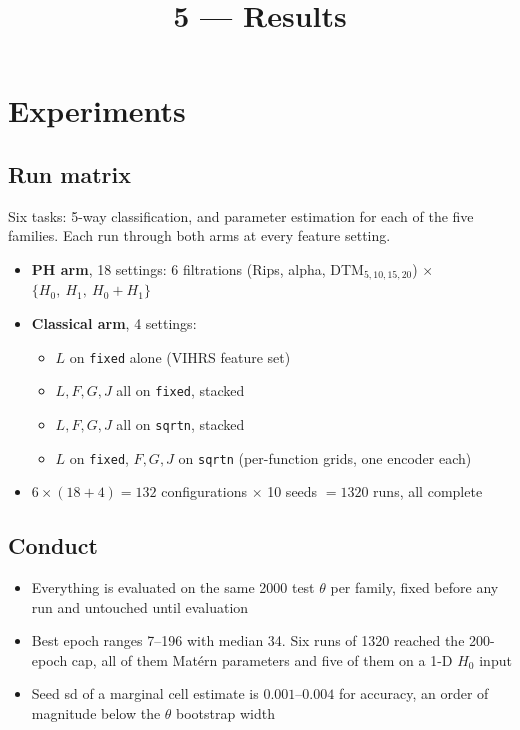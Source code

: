 \documentclass[11pt]{article}
\title{5 --- Results}
\date{}
\begin{document}
\maketitle

\section{Experiments}

\subsection*{Run matrix}
Six tasks: 5-way classification, and parameter estimation for each of the five families. Each run through both arms at every feature setting.
\begin{itemize}
  \item \textbf{PH arm}, 18 settings: 6 filtrations (Rips, alpha, DTM$_{5,10,15,20}$) $\times$ $\{H_0,\ H_1,\ H_0{+}H_1\}$
  \item \textbf{Classical arm}, 4 settings:
  \begin{itemize}
    \item $L$ on \texttt{fixed} alone (VIHRS feature set)
    \item $L,F,G,J$ all on \texttt{fixed}, stacked
    \item $L,F,G,J$ all on \texttt{sqrtn}, stacked
    \item $L$ on \texttt{fixed}, $F,G,J$ on \texttt{sqrtn} (per-function grids, one encoder each)
  \end{itemize}
  \item $6\times(18+4)=132$ configurations $\times$ 10 seeds $=1320$ runs, all complete
\end{itemize}

\subsection*{Conduct}
\begin{itemize}
  \item Everything is evaluated on the same 2000 test $\theta$ per family, fixed before any run and untouched until evaluation
  \item Best epoch ranges 7--196 with median 34. Six runs of 1320 reached the 200-epoch cap, all of them Mat\'ern parameters and five of them on a 1-D $H_0$ input
  \item Seed sd of a marginal cell estimate is $0.001$--$0.004$ for accuracy, an order of magnitude below the $\theta$ bootstrap width
\end{itemize}
\end{document}
